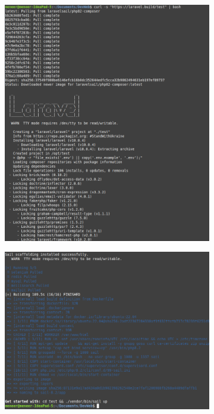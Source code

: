 \documentclass[internal]{nhitec_design}
\begin{document}
        \begin{figure}[h]
            \centering
            \begin{subfigure}{0.3\textwidth}
                \includegraphics[width=\textwidth]{Images_formation/CreateProject.png}
            \end{subfigure}
            \begin{subfigure}{0.3\textwidth}
                \includegraphics[width=\textwidth]{Images_formation/CreateProject2.png}
            \end{subfigure}
        \end{figure}
\end{document}
